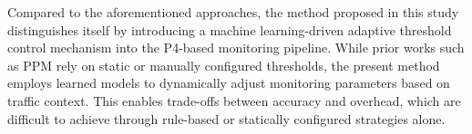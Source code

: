 Compared to the aforementioned approaches, the method proposed in this study distinguishes itself by introducing a machine learning-driven adaptive threshold control mechanism into the P4-based monitoring pipeline. 
While prior works such as PPM rely on static or manually configured thresholds, the present method employs learned models to dynamically adjust monitoring parameters based on traffic context. 
This enables trade-offs between accuracy and overhead, which are difficult to achieve through rule-based or statically configured strategies alone.
